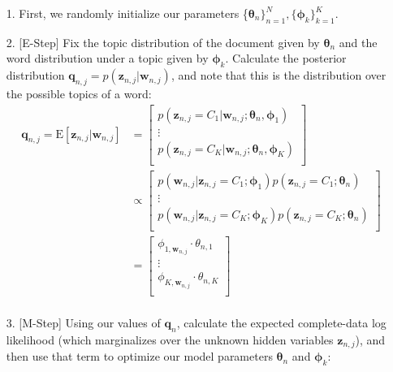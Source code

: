 \begin{itemize}
    \item[1.] First, we randomly initialize our parameters \{$\boldsymbol{\theta}_n \}_{n=1}^{N}, \{ \boldsymbol{\phi}_k\}_{k=1}^{K}$.
    \item[2.] [E-Step] Fix the topic distribution of the document given by $\boldsymbol{\theta}_n$ and the word distribution under a topic given by $\boldsymbol{\phi}_k$. Calculate the posterior distribution $\textbf{q}_{n, j} = p(\textbf{z}_{n, j} | \textbf{w}_{n, j})$, and note that this is the distribution over the possible topics of a word:
        \begin{align*}
            \textbf{q}_{n, j} = \mathrm{E}[\textbf{z}_{n, j} | \textbf{w}_{n, j}] &= \begin{bmatrix}
                p(\textbf{z}_{n, j} = C_1 | \textbf{w}_{n, j}; \boldsymbol{\theta}_n, \boldsymbol{\phi}_1) \\
                \vdots \\
                p(\textbf{z}_{n, j} = C_K | \textbf{w}_{n, j}; \boldsymbol{\theta}_n, \boldsymbol{\phi}_K) \\
            \end{bmatrix} \\
            &\propto \begin{bmatrix}
                p(\textbf{w}_{n, j} | \textbf{z}_{n, j} = C_1; \boldsymbol{\phi}_1) p(\textbf{z}_{n, j}  = C_1; \boldsymbol{\theta}_n) \\
                \vdots \\
                p(\textbf{w}_{n, j} | \textbf{z}_{n, j} = C_K; \boldsymbol{\phi}_K) p(\textbf{z}_{n, j}  = C_K; \boldsymbol{\theta}_n) \\
            \end{bmatrix} \\
            &= \begin{bmatrix}
                \phi_{1, \textbf{w}_{n, j}} \cdot \theta_{n, 1} \\
                \vdots \\
                \phi_{K, \textbf{w}_{n, j}} \cdot \theta_{n, K} \\
            \end{bmatrix} \\
        \end{align*}
    \item[3.] [M-Step] Using our values of $\textbf{q}_n$, calculate the expected complete-data log likelihood (which marginalizes over the unknown hidden variables $\textbf{z}_{n, j}$), and then use that term to optimize our model parameters $\boldsymbol{\theta}_n$ and $\boldsymbol{\phi}_k$:

\end{itemize}
